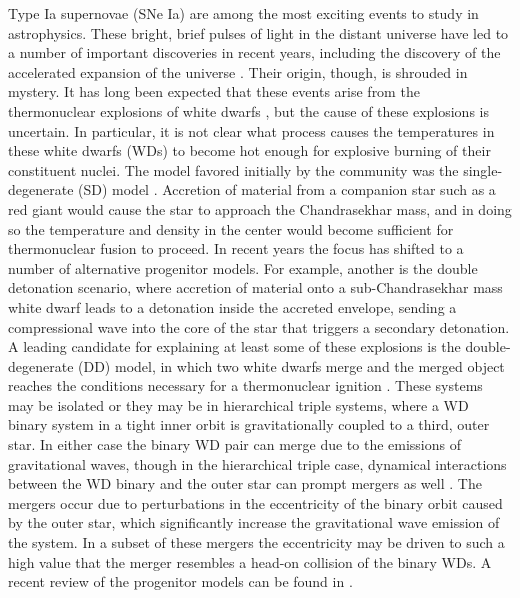 \documentclass[12pt]{article}
\begin{document}
Type Ia supernovae (SNe Ia) are among the most exciting
events to study in astrophysics. These bright, brief pulses of light
in the distant universe have led to a number of important discoveries
in recent years, including the discovery of the accelerated expansion
of the universe \citep{perlmutter1999,riess1998}. Their origin, though,
is shrouded in mystery. It has long been expected that these
events arise from the thermonuclear explosions of white dwarfs
\citep{hoyle-fowler:1960}, but the cause of these explosions is
uncertain. In particular, it is not clear what process causes the
temperatures in these white dwarfs (WDs) to become hot enough for explosive
burning of their constituent nuclei. The model favored initially by the
community was the single-degenerate (SD) model
\citep{whelan-iben:1973}. Accretion of material from a companion star
such as a red giant would cause the star to approach the Chandrasekhar
mass, and in doing so the temperature and density in the center would
become sufficient for thermonuclear fusion to proceed. In
recent years the focus has shifted to a number of alternative progenitor models.
For example, another is the double detonation scenario, where accretion of material onto a
sub-Chandrasekhar mass white dwarf leads to a detonation inside the
accreted envelope, sending a compressional wave into the
core of the star that triggers a secondary detonation. A
leading candidate for explaining at least some of these explosions is
the double-degenerate (DD) model, in which two white dwarfs merge and
the merged object reaches the conditions necessary for a thermonuclear
ignition \citep{ibentutukov:1984,webbink:1984}. These systems
may be isolated or they may be in hierarchical triple systems, where a WD binary
system in a tight inner orbit is gravitationally coupled to a third, outer star.
In either case the binary WD pair can merge due to the emissions of gravitational waves,
though in the hierarchical triple case, dynamical interactions between the WD binary and
the outer star can prompt mergers as well \citep{thompson:2011,hamers:2013}. The mergers
occur due to perturbations in the eccentricity of the binary orbit caused by the outer
star, which significantly increase the gravitational wave emission of the system. In a
subset of these mergers the eccentricity may be driven to such a high value that the
merger resembles a head-on collision of the binary WDs. A recent review of the progenitor
models can be found in \citet{hillebrandt:2013}.
\end{document}
